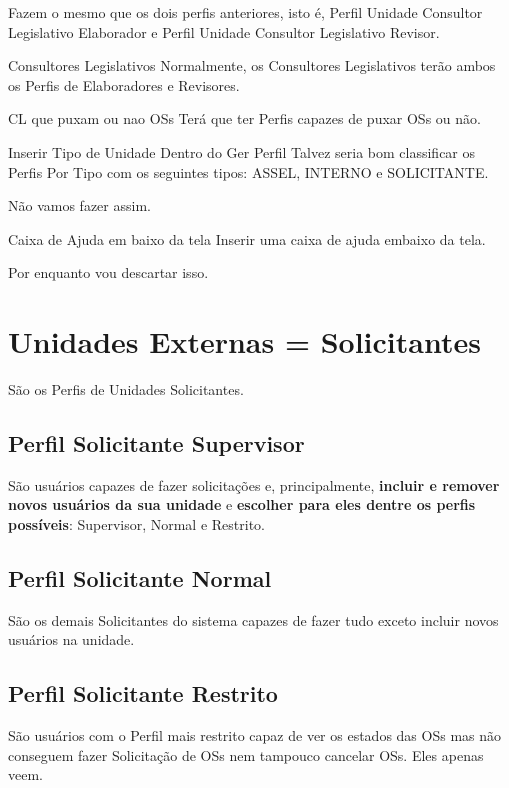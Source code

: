 	Fazem o mesmo que os dois perfis anteriores, isto é, Perfil Unidade Consultor Legislativo Elaborador e Perfil Unidade Consultor Legislativo Revisor.
		
	\begin{imagine}{Consultores Legislativos}
		Normalmente, os Consultores Legislativos terão ambos os Perfis de Elaboradores e Revisores.
	\end{imagine}

	\begin{funcionalidade}{CL que puxam ou nao OSs}
		Terá que ter Perfis capazes de puxar OSs ou não.
	\end{funcionalidade}
	
	\begin{funcionalidade}[1]{Inserir Tipo de Unidade Dentro do Ger Perfil}
		Talvez seria bom classificar os Perfis Por Tipo com os seguintes tipos: ASSEL, INTERNO e SOLICITANTE. 
		
		Não vamos fazer assim.		
	\end{funcionalidade}
	

	\begin{funcionalidade}[1]{Caixa de Ajuda em baixo da tela}
		Inserir uma caixa de ajuda embaixo da tela.
		
		Por enquanto vou descartar isso.
	\end{funcionalidade}

	
	
\section{Unidades Externas = Solicitantes}	

São os Perfis de Unidades Solicitantes.

	\subsection{Perfil Solicitante Supervisor}
	
	São usuários capazes de fazer solicitações e, principalmente, \textbf{incluir e remover novos usuários da sua unidade} e \textbf{escolher para eles dentre os perfis possíveis}: Supervisor, Normal e Restrito.
	
	\subsection{Perfil Solicitante Normal}
	
	São os demais Solicitantes do sistema capazes de fazer tudo exceto incluir novos usuários na unidade.	
	
	\subsection{Perfil Solicitante Restrito}
	
	São usuários com o Perfil mais restrito capaz de ver os estados das OSs mas não conseguem fazer Solicitação de OSs nem tampouco cancelar OSs. Eles apenas veem.
	
	
	
	

	





